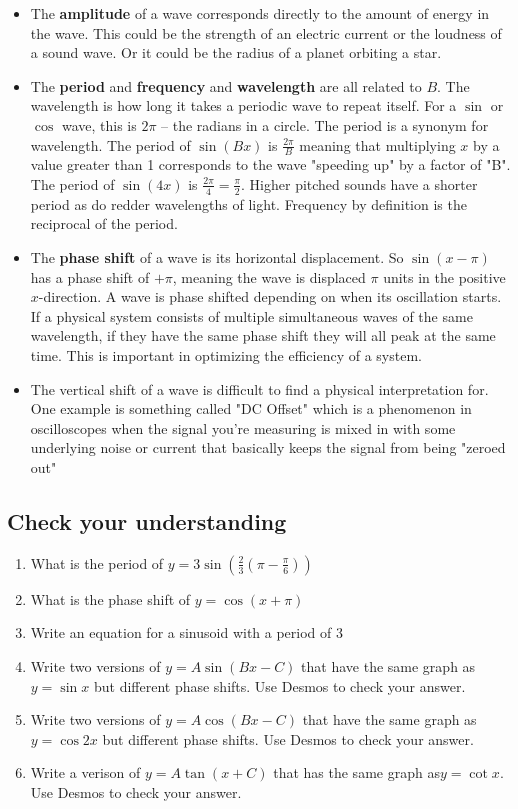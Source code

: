 \documentclass{article}
\begin{document}
\begin{multicols}{2}
\begin{itemize}
	\item The \textbf{amplitude} of a wave corresponds directly to the amount of energy in the wave. This could be the strength of an electric current or the loudness of a sound wave. Or it could be the radius of a planet orbiting a star.
	\item The \textbf{period} and \textbf{frequency} and \textbf{wavelength} are all related to $B$. The wavelength is how long it takes a periodic wave to repeat itself. For a $\sin$ or $\cos$ wave, this is $2\pi$ -- the radians in a circle. The period is a synonym for wavelength. The period of $\sin(Bx)$ is $\frac{2\pi}{B}$ meaning that multiplying $x$ by a value greater than 1 corresponds to the wave "speeding up" by a factor of "B". The period of $\sin(4x)$ is $\frac{2\pi}{4} = \frac{\pi}{2}$. Higher pitched sounds have a shorter period as do redder wavelengths of light. Frequency by definition is the reciprocal of the period.
	\item The \textbf{phase shift} of a wave is its horizontal displacement. So $\sin(x-\pi)$ has a phase shift of $+\pi$, meaning the wave is displaced $\pi$ units in the positive $x$-direction. A wave is phase shifted depending on when its oscillation starts. If a physical system consists of multiple simultaneous waves of the same wavelength, if they have the same phase shift they will all peak at the same time. This is important in optimizing the efficiency of a system.
	\item The vertical shift of a wave is difficult to find a physical interpretation for. One example is something called "DC Offset" which is a phenomenon in oscilloscopes when the signal you're measuring is mixed in with some underlying noise or current that basically keeps the signal from being "zeroed out"
\end{itemize}

\subsection*{Check your understanding}

\begin{enumerate}
	\setlength{\itemsep}{6ex}
	\item What is the period of $y=3 \sin (\frac23(\pi-\frac{\pi}{6}))$
	\item What is the phase shift of $y=\cos(x+\pi)$
	\item Write an equation for a sinusoid with a period of 3
	\item Write two versions of $y=A\sin (Bx-C)$ that have the same graph as $y=\sin x$ but different phase shifts. Use Desmos to check your answer.
	\item  Write two versions of $y=A\cos (Bx-C)$ that have the same graph as $y=\cos 2x$ but different phase shifts. Use Desmos to check your answer.
	\item Write a verison of $y=A\tan(x+C)$ that has the same graph as$y=\cot x$. Use Desmos to check your answer.
\end{enumerate}


\end{multicols}
\end{document}
